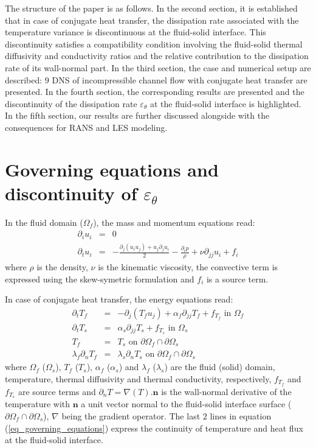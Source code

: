 \documentclass[review]{elsarticle}
\begin{document}
The structure of the paper is as follows.
In the second section, it is established that in case of conjugate heat transfer, the dissipation rate associated with the temperature variance is discontinuous at the fluid-solid interface.
This discontinuity satisfies a compatibility condition involving the fluid-solid thermal diffusivity and conductivity ratios and the relative contribution to the dissipation rate of its wall-normal part.
In the third section, the case and numerical setup are described: $9$ DNS of incompressible channel flow with conjugate heat transfer are presented.
In the fourth section, the corresponding results are presented and the discontinuity of the dissipation rate $\varepsilon_\theta$ at the fluid-solid interface is highlighted.
{\color{red} In the fifth section, our results are further discussed alongside with the consequences for RANS and LES modeling.}

\section{Governing equations and discontinuity of $\varepsilon_\theta$}

In the fluid domain ($\Omega_f$), the mass and momentum equations read:
\begin{eqnarray}
\partial_i u_i & = & 0 \nonumber \\
\partial_t u_i & = & - \frac{\partial_j \left( u_i u_j \right) + u_j \partial_j u_i}{2} - \frac{\partial_i p}{\rho} + \nu \partial_{jj} u_i + f_i
\end{eqnarray}
where $\rho$ is the density, $\nu$ is the kinematic viscosity, the convective term is expressed using the skew-symetric formulation and $f_i$ is a source term.

In case of conjugate heat transfer, the energy equations read:
\begin{eqnarray} \label{eq_governing_equations}
\partial_t T_f & = & - \partial_j \left( T_f u_j \right) + \alpha_f \partial_{jj} T_f + f_{T_f} \mbox{ in } \Omega_f \nonumber \\
\partial_t T_s & = & \alpha_s \partial_{jj} T_s + f_{T_s} \mbox{ in } \Omega_s \nonumber \\
T_f & = & T_s \mbox{ on } \partial \Omega_f \cap \partial \Omega_s \nonumber \\
\lambda_f \partial_n T_f & = & \lambda_s \partial_n T_s \mbox{ on } \partial \Omega_f \cap \partial \Omega_s
\end{eqnarray}
where $\Omega_f$ ($\Omega_s$), $T_f$ ($T_s$), $\alpha_f$ ($\alpha_s$) and $\lambda_f$ ($\lambda_s$) are the fluid (solid) domain, temperature, thermal diffusivity and thermal conductivity, respectively, $f_{T_f}$ and $f_{T_s}$ are source terms and $\partial_n T = \nabla \left( T \right) . \textbf{n}$ is the wall-normal derivative of the temperature with $\textbf{n}$ a unit vector normal to the fluid-solid interface surface ($\partial \Omega_f \cap \partial \Omega_s$), $\nabla$ being the gradient operator.
The last $2$ lines in equation (\ref{eq_governing_equations}) express the continuity of temperature and heat flux at the fluid-solid interface.
\end{document}
